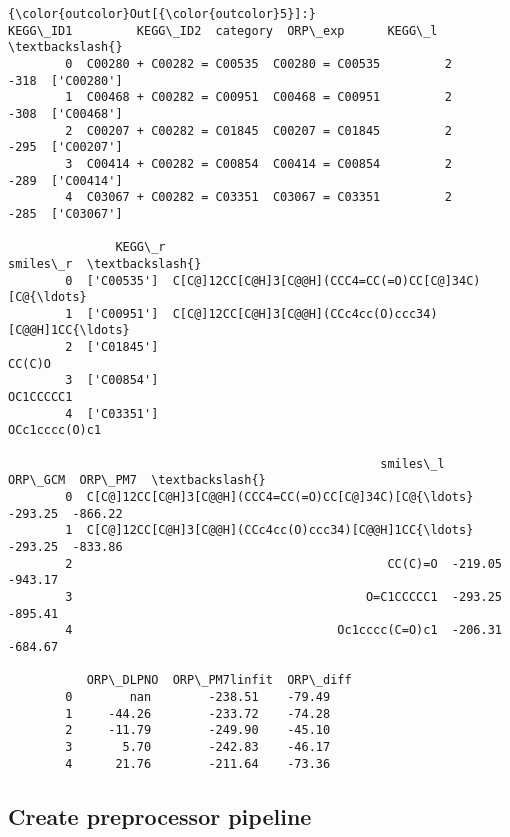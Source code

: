 \documentclass[11pt]{article}
\begin{document}
\begin{Verbatim}[commandchars=\\\{\}]
{\color{outcolor}Out[{\color{outcolor}5}]:}                    KEGG\_ID1         KEGG\_ID2  category  ORP\_exp      KEGG\_l  \textbackslash{}
        0  C00280 + C00282 = C00535  C00280 = C00535         2     -318  ['C00280']   
        1  C00468 + C00282 = C00951  C00468 = C00951         2     -308  ['C00468']   
        2  C00207 + C00282 = C01845  C00207 = C01845         2     -295  ['C00207']   
        3  C00414 + C00282 = C00854  C00414 = C00854         2     -289  ['C00414']   
        4  C03067 + C00282 = C03351  C03067 = C03351         2     -285  ['C03067']   
        
               KEGG\_r                                           smiles\_r  \textbackslash{}
        0  ['C00535']  C[C@]12CC[C@H]3[C@@H](CCC4=CC(=O)CC[C@]34C)[C@{\ldots}   
        1  ['C00951']  C[C@]12CC[C@H]3[C@@H](CCc4cc(O)ccc34)[C@@H]1CC{\ldots}   
        2  ['C01845']                                             CC(C)O   
        3  ['C00854']                                          OC1CCCCC1   
        4  ['C03351']                                      OCc1cccc(O)c1   
        
                                                    smiles\_l  ORP\_GCM  ORP\_PM7  \textbackslash{}
        0  C[C@]12CC[C@H]3[C@@H](CCC4=CC(=O)CC[C@]34C)[C@{\ldots}  -293.25  -866.22   
        1  C[C@]12CC[C@H]3[C@@H](CCc4cc(O)ccc34)[C@@H]1CC{\ldots}  -293.25  -833.86   
        2                                            CC(C)=O  -219.05  -943.17   
        3                                         O=C1CCCCC1  -293.25  -895.41   
        4                                     Oc1cccc(C=O)c1  -206.31  -684.67   
        
           ORP\_DLPNO  ORP\_PM7linfit  ORP\_diff  
        0        nan        -238.51    -79.49  
        1     -44.26        -233.72    -74.28  
        2     -11.79        -249.90    -45.10  
        3       5.70        -242.83    -46.17  
        4      21.76        -211.64    -73.36  
\end{Verbatim}
            
    \subsection{Create preprocessor
pipeline}\label{create-preprocessor-pipeline}
\end{document}
